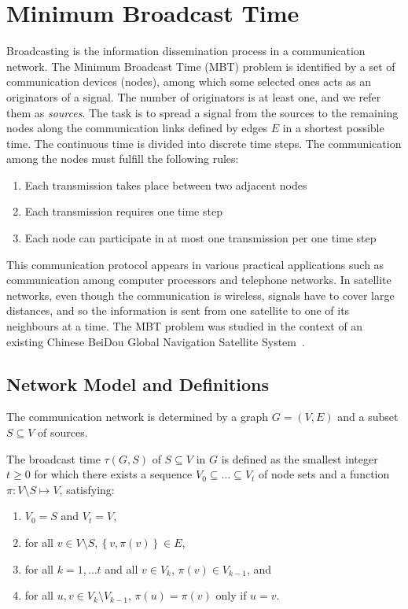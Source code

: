 \chapter{Minimum Broadcast Time}\label{sec:mbt}

Broadcasting is the information dissemination process in a communication network.
The Minimum Broadcast Time (MBT) problem is identified by a set of communication devices (nodes), among which some selected ones acts as an originators of a signal.
The number of originators is at least one, and we refer them as \emph{sources}.
The task is to spread a signal from the sources to the remaining nodes along the communication links defined by edges $E$ in a shortest possible time.
The continuous time is divided into discrete time steps.
The communication among the nodes must fulfill the following rules:
\begin{enumerate}
\item Each transmission takes place between two adjacent nodes
\item Each transmission requires one time step
\item Each node can participate in at most one transmission per one time step
\end{enumerate}

This communication protocol appears in various practical applications such as communication among computer processors and telephone networks.
In satellite networks, even though the communication is wireless, signals have to cover large distances, 
and so the information is sent from one satellite to one of its neighbours at a time.
The MBT problem was studied in the context of an existing Chinese BeiDou Global Navigation Satellite System~\cite{chu17}.

\section{Network Model and Definitions}

The communication network is determined by a graph $G=(V,E)$ and a subset $S\subseteq V$ of sources.

\begin{definition}\label{def:mbt}
The broadcast time $\tau(G,S)$ of $S\subseteq V$ in $G$ is defined as the smallest integer $t\geq 0$
for which there exists a sequence $V_0\subseteq\dots\subseteq V_t$ of node sets and a function $\pi:V\setminus S\mapsto V$, satisfying:
\begin{enumerate}
\item $V_0=S$ and $V_t=V$,
\item for all $v\in V\setminus S, \left\{v,\pi(v)\right\}\in E$,
\item for all $k=1,\dots t$ and all $v\in V_k$, $\pi(v)\in V_{k-1}$, and
\item for all $u,v\in V_k\setminus V_{k-1}$, $\pi(u)=\pi(v)$ only if $u=v$.
\end{enumerate}
\end{definition}

